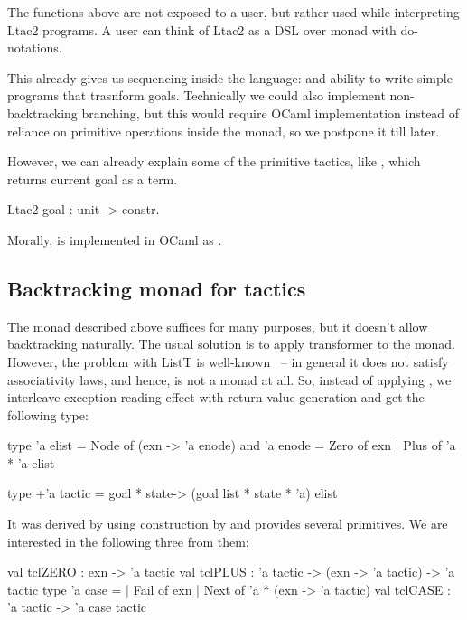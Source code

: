 The functions above are not exposed to a user, but rather used while interpreting Ltac2 programs.
A user can think of Ltac2 as a DSL over  monad with do-notations.

This already gives us sequencing inside the language:  and ability to write simple programs that trasnform goals.
Technically we could also implement non-backtracking branching, but this would require OCaml implementation instead of reliance on primitive operations inside the monad, so we postpone it till later.

However, we can already explain some of the primitive tactics, like , which returns current goal as a term.
\begin{coq}
  Ltac2 goal : unit -> constr.
\end{coq}\vspace{-1em}
Morally,  is implemented in OCaml as .

\subsection{Backtracking monad for tactics}
\label{sec:backtr-monad-tact}

The monad described above suffices for many purposes, but it doesn't allow backtracking naturally.
The usual solution is to apply  transformer to the monad.
However, the problem with ListT is well-known~\cite{jones1993composing} -- in general it does not satisfy associativity laws, and hence, is not a monad at all.
So, instead of applying , we interleave exception reading effect with return value generation and get the following type:
\begin{ocaml}
type 'a elist = Node of (exn -> 'a enode)
and 'a enode = Zero of exn | Plus of 'a * 'a elist

type +'a tactic = goal * state-> (goal list * state * 'a) elist
\end{ocaml}
It was derived by \citet{spiwackAbstractTypeConstructing2010} using construction by \citet{kiselyovBacktrackingInterleavingTerminating2005} and provides several primitives.
We are interested in the following three from them:
\begin{ocaml}
val tclZERO : exn -> 'a tactic
val tclPLUS : 'a tactic -> (exn -> 'a tactic) -> 'a tactic
type 'a case =
  | Fail of exn
  | Next of 'a * (exn -> 'a tactic)
val tclCASE : 'a tactic -> 'a case tactic
\end{ocaml}

